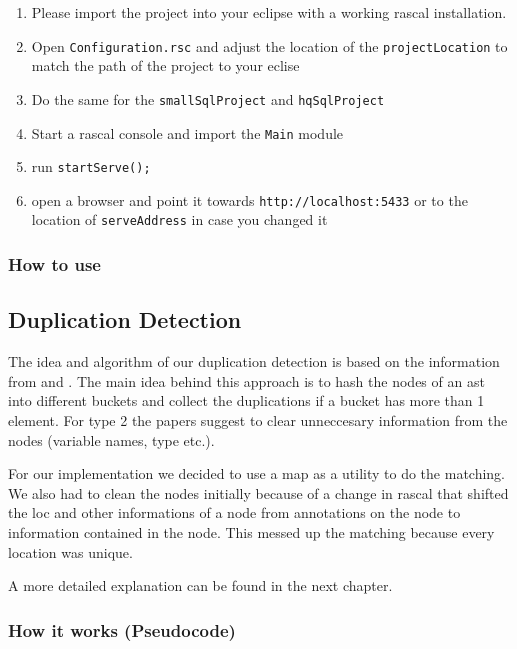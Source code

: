 \documentclass{uva-inf-article}
\begin{document}
\begin{enumerate}

\item
  Please import the project into your eclipse with a working rascal
  installation.
\item
  Open \texttt{Configuration.rsc} and adjust the location of the
  \texttt{projectLocation} to match the path of the project to your
  eclise
\item
  Do the same for the \texttt{smallSqlProject} and \texttt{hqSqlProject}
\item
  Start a rascal console and import the \texttt{Main} module
\item
  run \texttt{startServe();}
\item
  open a browser and point it towards \texttt{http://localhost:5433} or
  to the location of \texttt{serveAddress} in case you changed it
\end{enumerate}


\subsubsection{How to use}


\subsection{Duplication Detection}

The idea and algorithm of our duplication detection is based on the
information from \cite{lazar2014clone} and \cite{baxter1998clone}. The main idea behind this approach
is to hash the nodes of an ast into different buckets and collect the
duplications if a bucket has more than 1 element. For type 2 the papers
suggest to clear unneccesary information from the nodes (variable names,
type etc.).

For our implementation we decided to use a map as a utility to do the
matching. We also had to clean the nodes initially because of a change
in rascal that shifted the loc and other informations of a node from
annotations on the node to information contained in the node. This
messed up the matching because every location was unique.

A more detailed explanation can be found in the next chapter.


\subsubsection{How it works
(Pseudocode)}
\end{document}

